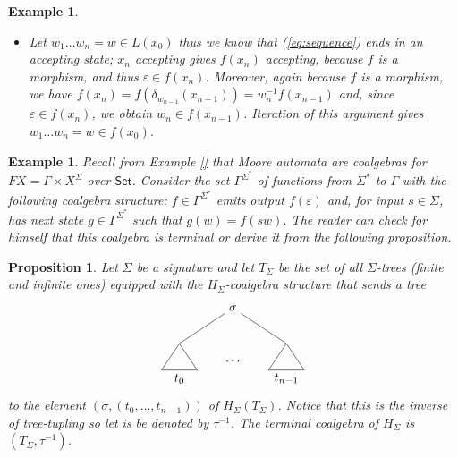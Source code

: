 \documentclass[letterpaper, 11pt, oneside]{memoir}
\theoremstyle{myteo}
\newtheorem{proposition}[theorem]{Proposition}
\newtheorem{example}[theorem]{Example}
\numberwithin{equation}{section}
\newcommand{\Set}{\textsf{Set}}
\begin{document}
\begin{example}
\begin{itemize}
    Finally since \(w \in f(x_0)\) we have \(\varepsilon \in f(x_n)\) so \(x_n\) is accepting again \(f\) is a morphism.
  \item[b.] Let \(w_1\ldots w_n = w \in L(x_0)\) thus we know that (\ref{eq:sequence}) ends in an accepting state; \(x_n\) accepting gives \(f(x_n)\) accepting, because \(f\) is a morphism, and thus \(\varepsilon \in f(x_n)\).
    Moreover, again because \(f\) is a morphism, we have \(f(x_n) = f(\delta_{w_{n-1}}(x_{n-1})) = w_n^{-1}f(x_{n-1})\) and, since \(\varepsilon \in f(x_n)\), we obtain \(w_n \in f(x_{n-1})\).
    Iteration of this argument gives \(w_1 \ldots w_n = w \in f(x_0)\).
  \end{itemize}
\end{example}

\begin{example}
  Recall from Example \ref{} that Moore automata are coalgebras for \(FX = \Gamma \times X^\Sigma\) over \(\Set\).
  Consider the set \(\Gamma^{\Sigma^*}\) of functions from \(\Sigma^*\) to \(\Gamma\) with the following coalgebra structure: \(f\in \Gamma^{\Sigma^*}\) emits output \(f(\varepsilon)\) and, for input \(s \in \Sigma\), has next state \(g \in \Gamma^{\Sigma^*}\) such that \(g(w) = f(sw)\).
  The reader can check for himself that this coalgebra is terminal or derive it from the following proposition.
\end{example}

\begin{proposition}
  Let \(\Sigma\) be a signature and let \(T_\Sigma\) be the set of all \(\Sigma\)-trees (finite and infinite ones) equipped with the \(H_\Sigma\)-coalgebra structure that sends a tree
  \begin{equation*}
    \begin{tikzpicture}
      \node (t1) at (0,-0.5){\(t_0\)};
      \node (t2) at (1.5,0){\(\ldots\)};
      \node (t3) at (3,-0.5){\(t_{n-1}\)};
      \node (s) at (1.5, 1.5){\(\sigma\)};
      
      \draw[-] (0,0.5) -- (.5, -.25) -- (-.5, -.25) -- (0, .5);
      \draw[-] (3,0.5) -- (3.5, -.25) -- (2.5, -.25) -- (3, .5);

      \draw[-] (s) -- (0,0.5);
      \draw[-] (s) -- (3,0.5);
    \end{tikzpicture}
  \end{equation*}
  to the element \((\sigma, (t_0, \ldots, t_{n-1}))\) of \(H_\Sigma(T_\Sigma)\).
  Notice that this is the inverse of tree-tupling so let is be denoted by \(\tau^{-1}\).
  The terminal coalgebra of \(H_\Sigma\) is \((T_\Sigma, \tau^{-1})\).
\end{proposition}
\end{document}
